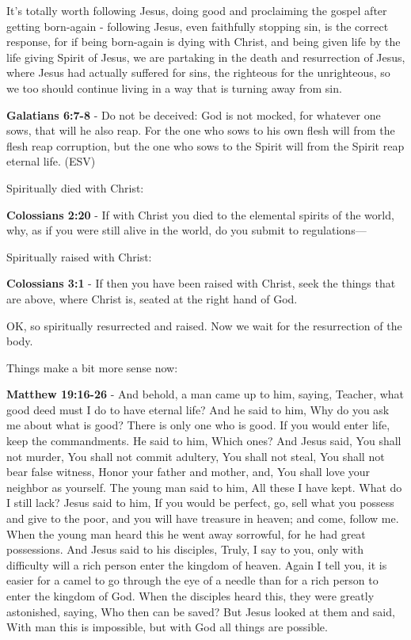 \documentclass[11pt]{article}
\begin{document}
It's totally worth following Jesus, doing good and proclaiming the gospel after getting born-again - following Jesus, even faithfully stopping sin, is the correct response,
for if being born-again is dying with Christ, and being given life by the life giving Spirit of Jesus,
we are partaking in the death and resurrection of Jesus, where Jesus had actually suffered for sins, the righteous for the unrighteous, so we too should continue living in a way that is turning away from sin.

\textbf{Galatians 6:7-8} - Do not be deceived: God is not mocked, for whatever one sows, that will he also reap. For the one who sows to his own flesh will from the flesh reap corruption, but the one who sows to the Spirit will from the Spirit reap eternal life. (ESV)

Spiritually died with Christ:

\textbf{Colossians 2:20} - If with Christ you died to the elemental spirits of the world, why, as if you were still alive in the world, do you submit to regulations—

Spiritually raised with Christ:

\textbf{Colossians 3:1} - If then you have been raised with Christ, seek the things that are above, where Christ is, seated at the right hand of God.

OK, so spiritually resurrected and raised. Now we wait for the resurrection of the body.

Things make a bit more sense now:

\textbf{Matthew 19:16-26} - And behold, a man came up to him, saying, Teacher, what good deed must I do to have eternal life? And he said to him, Why do you ask me about what is good? There is only one who is good. If you would enter life, keep the commandments. He said to him, Which ones? And Jesus said, You shall not murder, You shall not commit adultery, You shall not steal, You shall not bear false witness, Honor your father and mother, and, You shall love your neighbor as yourself. The young man said to him, All these I have kept. What do I still lack? Jesus said to him, If you would be perfect, go, sell what you possess and give to the poor, and you will have treasure in heaven; and come, follow me. When the young man heard this he went away sorrowful, for he had great possessions. And Jesus said to his disciples, Truly, I say to you, only with difficulty will a rich person enter the kingdom of heaven. Again I tell you, it is easier for a camel to go through the eye of a needle than for a rich person to enter the kingdom of God. When the disciples heard this, they were greatly astonished, saying, Who then can be saved? But Jesus looked at them and said, With man this is impossible, but with God all things are possible.
\end{document}
